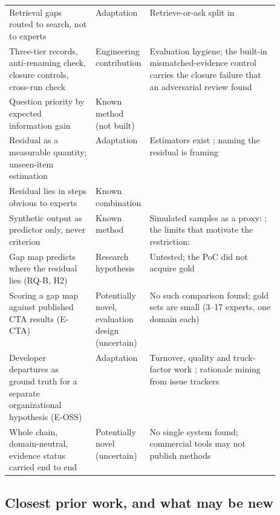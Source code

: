 \begin{table}[!tbp]
\begin{tabularx}{\linewidth}{@{}>{\raggedright\arraybackslash}p{0.32\linewidth}>{\raggedright\arraybackslash}p{0.2\linewidth}>{\raggedright\arraybackslash}X@{}}
    Retrieval gaps routed to search, not to experts & Adaptation & Retrieve-or-ask split in \textcite{taranukhin2026infogatherer} \\
    Three-tier records, anti-renaming check, closure controls, cross-run check & Engineering contribution & Evaluation hygiene; the built-in mismatched-evidence control carries the closure failure that an adversarial review found \\
    Question priority by expected information gain & Known method (not built) & \textcite{lindley1956measure,rao2018learning,choudhury2025bedllm} \\
    Residual as a measurable quantity; unseen-item estimation & Adaptation & Estimators exist \parencite{chao1987estimating,chao2012coverage}; naming the residual is framing \\
    Residual lies in steps obvious to experts & Known combination & \textcite{gordon2013reporting,paik2021world,sullivan2014use,chao1994percentage} \\
    Synthetic output as predictor only, never criterion & Known method & Simulated samples as a proxy: \textcite{argyle2023out}; the limits that motivate the restriction: \textcite{bisbee2024synthetic,cui2025large} \\
    Gap map predicts where the residual lies (RQ-B, H2) & Research hypothesis & Untested; the PoC did not acquire gold \\
    Scoring a gap map against published CTA results (E-CTA) & Potentially novel, evaluation design (uncertain) & No such comparison found; gold sets are small (3--17 experts, one domain each) \\
    Developer departures as ground truth for a separate organizational hypothesis (E-OSS) & Adaptation & Turnover, quality and truck-factor work \parencite{foucault2015impact,rigby2016quantifying,avelino2016novel,nassif2017revisiting}; rationale mining from issue trackers \parencite{zhao2024drminer} \\
    Whole chain, domain-neutral, evidence status carried end to end & Potentially novel (uncertain) & No single system found; commercial tools may not publish methods \\
    \bottomrule
  \end{tabularx}
\end{table}

\subsection{Closest prior work, and what may be new}\label{sec:approach-closest}\label{sec:approach-novelty}

